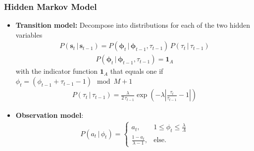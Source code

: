 \documentclass{beamer}
\begin{document}
\begin{frame}
\frametitle{Hidden Markov Model}
\begin{itemize}
\item \textbf{Transition model:} Decompose into distributions for each of the two hidden variables
\begin{align}
P(\mathbf s_t\,|\,\mathbf s_{t-1}) = P(\mathbf \phi_t\,|\,\mathbf \phi_{t-1}, \tau_{t-1}) \, P(\tau_t \, |\, \tau_{t-1}) 
\end{align} 
\vspace{-1em}
\begin{align}
P(\mathbf \phi_t\,|\,\mathbf \phi_{t-1}, \tau_{t-1}) = \mathbf 1_A
\end{align} 
with the indicator function $\mathbf 1_A$ that equals one if $\phi_t = (\phi_{t-1}+\tau_{t-1}-1)\mod M+1$
\begin{align}
P(\tau_t \, |\, \tau_{t-1}) = \frac{\lambda}{2 \, \tau_{t-1}}\exp \left( -\lambda \left| \frac{\tau_{t}}{\tau_{t-1}} -1 \right| \right)
\end{align} 
\item \textbf{Observation model}:
\vspace{-0.5em} 
\begin{align}
P(a_t\,|\,\phi_t) = \begin{cases}
    a_t, &1 \leq \phi_t\leq \frac{\lambda}{\Lambda}\\
    \frac{1-a_t}{\lambda-1}, &\text{else}.    
\end{cases}
\end{align} 

\end{itemize}




\end{frame}
\end{document}
